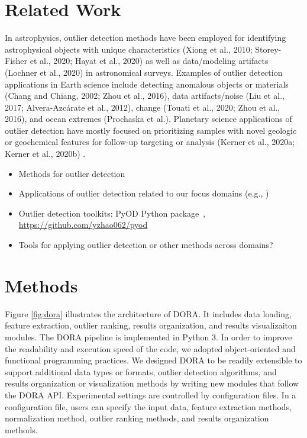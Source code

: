 \documentclass[letterpaper]{article} %
\begin{document}
\section{Related Work}
In astrophysics, 
    outlier detection methods have been employed for identifying astrophysical
     objects with unique characteristics (Xiong et al., 2010; 
     Storey-Fisher et al., 2020; Hayat et al., 2020) as well as 
     data/modeling artifacts~\citep{wagstaff:des-anom20} (Lochner et al., 2020) in 
     astronomical surveys. Examples of outlier detection applications in 
     Earth science include detecting anomalous objects or materials 
     (Chang and Chiang, 2002; Zhou et al., 2016), data artifacts/noise 
     (Liu et al., 2017; Alvera-Azcárate et al., 2012), change (Touati et al.,
      2020; Zhou et al., 2016),  and ocean extremes (Prochaska et al.). 
      Planetary science applications of outlier detection have mostly focused 
      on prioritizing samples with novel geologic or geochemical features for
       follow-up targeting or analysis (Kerner et al., 2020a; Kerner et al., 
       2020b) \citep{wagstaff:demud13}.

\begin{itemize}
\item Methods for outlier detection
\item Applications of outlier detection related to our focus domains 
(e.g., \citet{kerner2020comparison})
\item Outlier detection toolkits: PyOD Python
package~\citep{zhao:pyod19}, \url{https://github.com/yzhao062/pyod} 
\item Tools for applying outlier detection or other methods across
domains?
\end{itemize}

\section{Methods}

Figure \ref{fig:dora} illustrates the architecture of DORA. It includes 
data loading, feature extraction, outlier ranking, results organization, and 
results visualizaiton modules. The DORA pipeline is implemented in Python 3.
In order to improve the readability and execution speed of the code, we adopted
object-oriented and functional programming practices.  We designed DORA to be 
readily extensible to support additional data types or formats, outlier detection 
algorithms, and results organization or visualization methods by writing new 
modules that follow the DORA API. Experimental settings are controlled by 
configuration files. In a configuration file, users can specify the input data, 
feature extraction methods, normalization method, outlier ranking methods, and 
results organization methods. 
\end{document}
